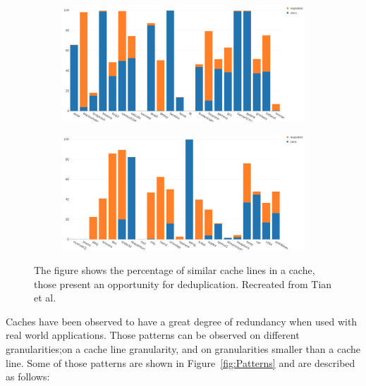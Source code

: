\begin{figure}
    \begin{subfigure}[t]{\textwidth}
        \includegraphics[width=\textwidth]{DedupPotential1.png}
    \end{subfigure}
    \begin{subfigure}[b]{\textwidth}
        \includegraphics[width=\textwidth]{DedupPotential2.png}
    \end{subfigure}
    \caption[Inter-line Patterns]{The figure shows the percentage of similar cache lines in a cache, those present an opportunity for deduplication. Recreated from Tian et al.\protect\cite{dedup}}
    \label{fig:DedupPotential}
\end{figure}
Caches have been observed to have a great degree of redundancy when used with real world applications. Those patterns can be observed on different granularities;on a cache line granularity, and on granularities smaller than a cache line. Some of those patterns are shown in Figure~\ref{fig:Patterns} and are described as follows:
